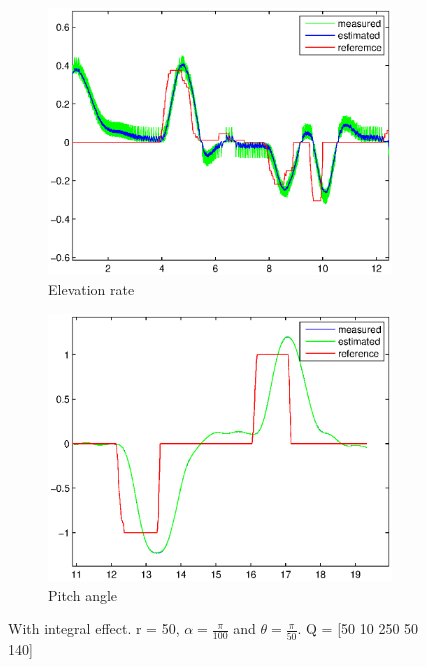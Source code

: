 \begin{figure}[H]
\graphicspath{ {Part4_pictures/}}
\begin{subfigure}{0.5\textwidth}
    \includegraphics[width=0.9\linewidth]{Part4_pictures/p4p2_int/p4_elevrate_better.eps} 
    \caption{Elevation rate}
    \label{fig:p4p2intP4e}
\end{subfigure}
\begin{subfigure}{0.5\textwidth}
    \includegraphics[width=0.9\linewidth]{Part4_pictures/p4p2_int/p4_pitch_better.eps}
    \caption{Pitch angle}
    \label{fig:p4p2intP4p}
\end{subfigure}
\caption{With integral effect. r = 50, $\alpha = \frac{\pi}{100}$ and $\theta = \frac{\pi}{50}$. Q = [50 10 250 50 140]}
\label{p4p2intP4}
\end{figure}

